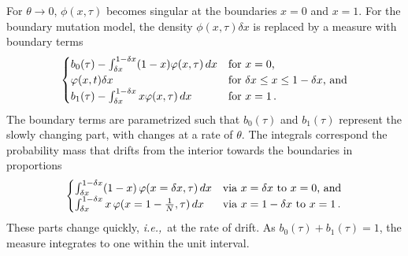 \documentclass[preprint]{elsarticle}
\newcommand\ie{{\it i.e.,}}
\begin{document}
For $\theta\to 0$, $\phi(x,\tau)$ becomes singular at the boundaries $x=0$ and $x=1$. For the boundary mutation model, the density $\phi(x,\tau)\delta x$ is replaced by a measure with boundary terms
\begin{equation}\label{eq:measure}
\begin{cases}
b_0(\tau)-\int_{\delta x}^{1-\delta x}(1-x)\varphi(x,\tau)\,dx &\text{for  $x=0$,}\\
\varphi(x,t)\delta x &\text{for $\delta x \leq x \leq 1-\delta x$, and}\\
b_1(\tau)-\int_{\delta x}^{1-\delta x}x\varphi(x,\tau)\,dx &\text{for  $x=1$\,.}\\
\end{cases}
\end{equation}
The boundary terms are parametrized such that $b_0(\tau)$ and $b_1(\tau)$ represent the slowly changing part, with changes at a rate of $\theta$. The integrals correspond the probability mass that drifts from the interior towards the boundaries in proportions
\begin{align}
  \begin{cases}
    \int_{\delta x}^{1-\delta x}(1-x)\,\varphi(x=\delta x,\tau)\,dx         &\text{via $x=\delta x$ to $x=0$, and}\\
    \int_{\delta x}^{1-\delta x}x\,\varphi(x=1-\frac1N,\tau) \,dx        & \text{via $x=1-\delta x$ to $x=1$\,.}
\end{cases}
\end{align}
These parts change quickly, \ie\ at the rate of drift. As $b_0(\tau)+b_1(\tau)=1$, the measure integrates to one within the unit interval. 
\end{document}

